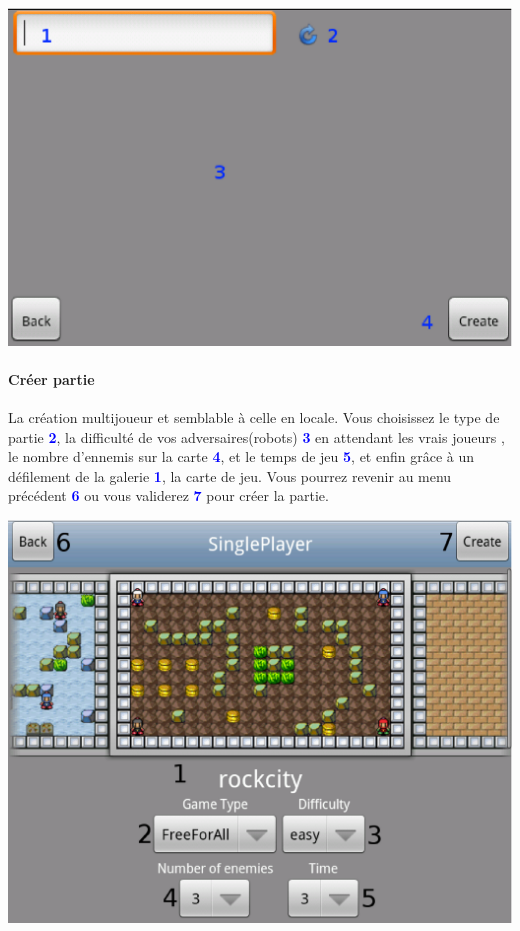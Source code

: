 		
	\begin{center}
		\includegraphics[scale=0.7]{Manuel/Img/19.eps}
	\end{center}
	
	\paragraph{Créer partie}
	La création multijoueur et semblable à celle en locale.
	Vous choisissez le type de partie
	\textcolor{blue}{\textbf{2}}, la difficulté de vos adversaires(robots)
	\textcolor{blue}{\textbf{3}} en attendant les vrais joueurs , le nombre
	d'ennemis sur la carte \textcolor{blue}{\textbf{4}}, et le temps de jeu
	\textcolor{blue}{\textbf{5}}, et enfin grâce à un défilement de la galerie
	\textcolor{blue}{\textbf{1}}, la carte de jeu. Vous pourrez revenir au menu
	précédent \textcolor{blue}{\textbf{6}} ou vous validerez
	\textcolor{blue}{\textbf{7}} pour créer la partie.
	
	\begin{center}
		\includegraphics[scale=0.4]{Manuel/Img/15.eps}
	\end{center}
	
